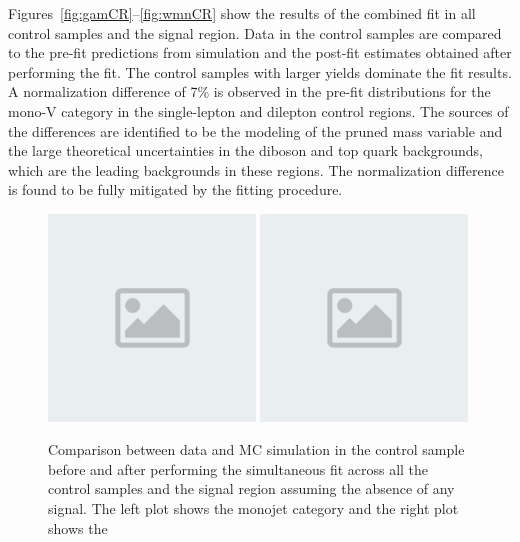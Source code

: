 Figures~\ref{fig:gamCR}--\ref{fig:wmnCR} show the results of the combined fit in all control samples and the signal region.
Data in the control samples are compared to the pre-fit predictions from simulation and
the post-fit estimates obtained after performing the fit.
The control samples with larger yields dominate the fit results.
A normalization difference of 7\% is observed in the pre-fit distributions for the mono-V category in the single-lepton and dilepton control regions. The sources of the differences are identified to be the modeling of the pruned mass variable and the large theoretical uncertainties in the diboson and top quark backgrounds, which are the leading backgrounds in these regions. The normalization difference is found to be fully mitigated by the fitting procedure.

\begin{figure}[hbtp]\begin{center}
\includegraphics[width=0.49\textwidth]{placeholder.png}
\includegraphics[width=0.49\textwidth]{placeholder.png}
\caption{
Comparison between data and MC simulation in the \phojets control sample
before and after performing the simultaneous fit across all the control samples and the signal region
assuming the absence of any signal. The left plot shows the monojet category and the right plot shows the
}
\end{center}
\end{figure}
